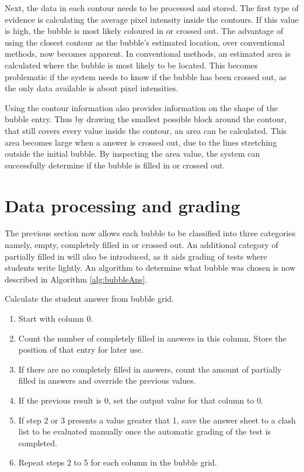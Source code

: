 Next, the data in each contour needs to be processed and stored. The first type of evidence is calculating the average pixel intensity inside the contours. If this value is high, the bubble is most likely coloured in or crossed out. The advantage of using the closest contour as the bubble's estimated location, over conventional methods, now becomes apparent. In conventional methods, an estimated area is calculated where the bubble is most likely to be located. This becomes problematic if the system needs to know if the bubble has been crossed out, as the only data available is about pixel intensities. 

Using the contour information also provides information on the shape of the bubble entry. Thus by drawing the smallest possible block around the contour, that still covers every value inside the contour, an area can be calculated. This area becomes large when a answer is crossed out, due to the lines stretching outside the initial bubble. By inspecting the area value, the system can successfully determine if the bubble is filled in or crossed out.

\section{Data processing and grading}

The previous section now allows each bubble to be classified into three categories namely, empty, completely filled in or crossed out. An additional category of partially filled in will also be introduced, as it aids grading of tests where students write lightly. An algorithm to determine what bubble was chosen is now described in Algorithm \ref{alg:bubbleAns}.

\begin{algorithm}[H]
\caption{Calculate the student answer from bubble grid.}
\label{alg:bubbleAns}
\begin{enumerate}
\item Start with column 0.
\item Count the number of completely filled in answers in this column. Store the position of that entry for later use.
\item If there are no completely filled in answers, count the amount of partially filled in answers and override the previous values.
\item If the previous result is 0, set the output value for that column to 0.
\item If step 2 or 3 presents a value greater that 1, save the answer sheet to a clash list to be evaluated manually once the automatic grading of the test is completed.
\item Repeat steps 2 to 5 for each column in the bubble grid.
\end{enumerate}
\end{algorithm}



